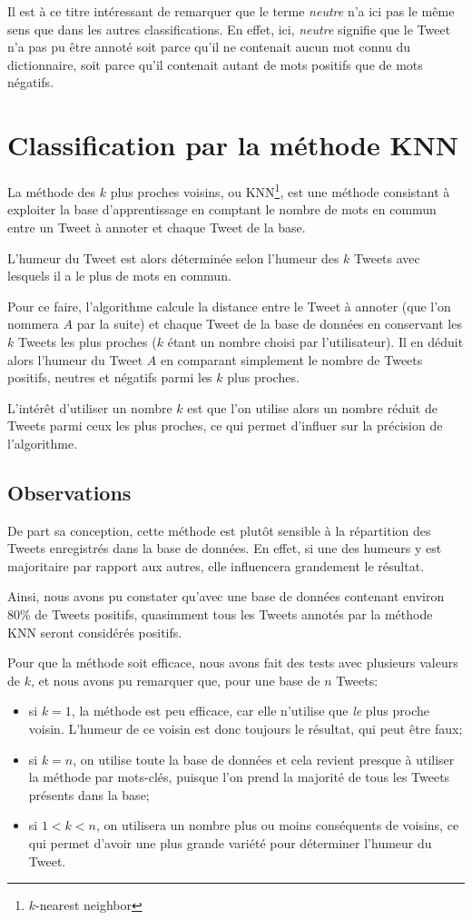 \documentclass[12pt,a4paper]{report}
\begin{document}
Il est à ce titre intéressant de remarquer que le terme \textit{neutre} n'a ici
pas le même sens que dans les autres classifications. En effet, ici,
\textit{neutre} signifie que le Tweet n'a pas pu être annoté soit parce qu'il ne
contenait aucun mot connu du dictionnaire, soit parce qu'il contenait autant de
mots positifs que de mots négatifs.

\section{Classification par la méthode KNN}
La méthode des $k$ plus proches voisins, ou KNN\footnote{$k$-nearest neighbor},
est une méthode consistant à exploiter la base d'apprentissage en comptant le
nombre de mots en commun entre un Tweet à annoter et chaque Tweet de la base.

L'humeur du Tweet est alors déterminée selon l'humeur des $k$ Tweets
avec lesquels il a le plus de mots en commun.

Pour ce faire, l'algorithme calcule la distance entre le Tweet à annoter (que
l'on nommera $A$ par la suite) et chaque Tweet de la base de données
en conservant les $k$ Tweets les plus proches ($k$ étant un nombre
choisi par l'utilisateur). Il en déduit alors l'humeur du Tweet $A$ en comparant
simplement le nombre de Tweets positifs, neutres et négatifs parmi les $k$ plus
proches.

L'intérêt d'utiliser un nombre $k$ est que l'on utilise alors un nombre réduit
de Tweets parmi ceux les plus proches, ce qui permet d'influer sur la précision
de l'algorithme.

\subsection{Observations}
De part sa conception, cette méthode est plutôt sensible à la répartition des
Tweets enregistrés dans la base de données. En effet, si une des humeurs y est
majoritaire par rapport aux autres, elle influencera grandement le résultat.

Ainsi, nous avons pu constater qu'avec une base de données contenant environ
80\% de Tweets positifs, quasimment tous les Tweets annotés par la méthode KNN
seront considérés positifs.

Pour que la méthode soit efficace, nous avons fait des tests avec plusieurs
valeurs de $k$, et nous avons pu remarquer que, pour une base de $n$ Tweets:

\begin{itemize}
	\item si $k=1$, la méthode est peu efficace, car elle n'utilise que
		\textit{le} plus proche voisin. L'humeur de ce voisin est donc
		toujours le résultat, qui peut être faux;
	\item si $k=n$, on utilise toute la base de données et cela revient presque
		à utiliser la méthode par mots-clés, puisque l'on prend la majorité de
		tous les Tweets présents dans la base;
	\item si $1 < k < n$, on utilisera un nombre plus ou moins conséquents de
		voisins, ce qui permet d'avoir une plus grande variété pour déterminer
		l'humeur du Tweet.
\end{itemize}
\end{document}
